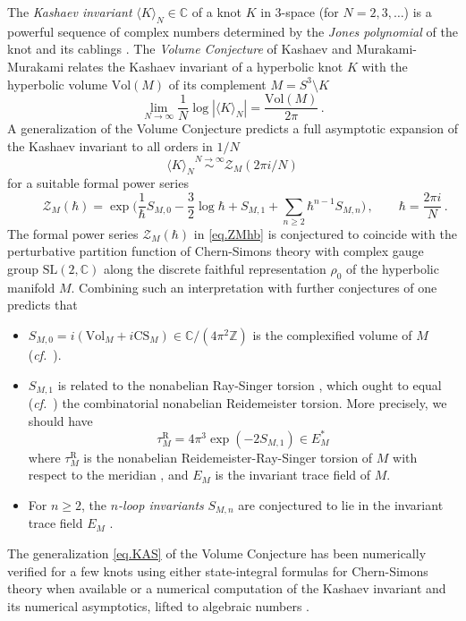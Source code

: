 \documentclass[12pt]{amsart}
\newcommand{\lbl}{\label}
\newcommand{\Reid}{\mathrm{R}}
\theoremstyle{definition}
\def\BZ{\mathbb Z}
\def\BC{\mathbb C}
\def\la{\langle}
\def\ra{\rangle}
\def\SL{\mathrm{SL}}
\def\be{  \begin{equation} }
\def\ee{  \end{equation} }
\def\hb{\hbar}
\def\vol{\mathrm{Vol}}
\newcommand{\CZ}{\mathcal{Z}}
\newcommand{\cf}{\emph{cf.}}
\numberwithin{equation}{section}
\begin{document}
The {\em Kashaev invariant} $\la K \ra_N \in \BC$ 
of a knot $K$ in 3-space (for $N=2,3,\dots$) is a powerful sequence of 
complex numbers determined by the {\em Jones polynomial} of the knot \cite{Jo} 
and its cablings \cite{Turaev, Witten-Jones}. The {\em Volume Conjecture} 
of Kashaev and Murakami-Murakami \cite{K94,K95,MM} relates the 
Kashaev invariant of a hyperbolic knot $K$ with the hyperbolic volume 
$\vol(M)$ of its complement $M=S^3\setminus K$ \cite{Th}
\be
\lim_{N\to\infty} \frac{1}{N} \log|\la K \ra_N|=\frac{\vol(M)}{2\pi} \,.
\ee
A generalization  of the Volume Conjecture \cite{Gu} 
predicts a full asymptotic expansion of the Kashaev invariant to all orders in
$1/N$ 
\be
\lbl{eq.KAS}
\la K \ra_N \overset{N\to\infty}{\sim} \CZ_M(2 \pi i /N)
\ee
for a suitable formal power series 
\be
\lbl{eq.ZMhb}
\qquad \CZ_M(\hb)=\exp\bigg(\frac1\hbar S_{M,0}-\frac32\log\hbar+S_{M,1}
+\sum_{n\geq 2}\hbar^{n-1}S_{M,n}\bigg)\,,\qquad \hbar = \frac{2\pi i}{N}\,.
\ee
The formal power series $\CZ_M(\hb)$ in \eqref{eq.ZMhb} is 
conjectured to coincide with the perturbative partition function of Chern-Simons theory with complex gauge group $\SL(2,\BC)$ along the discrete
faithful representation $\rho_0$ of the hyperbolic manifold $M$.
Combining such an interpretation with
further conjectures of \cite{DGLZ,Ga1,GL} one predicts that 
\begin{itemize}
%
\item
$S_{M,0}=i(\text{Vol}_M+i\text{CS}_M) \in \BC/(4 \pi^2\BZ)$ is the complexified volume of $M$ (\cf\ \cite{Thurston-paper, Neumann-combi}).
%
\item
$S_{M,1}$ is related \cite{Witten-cx, BNW, GuM} to the nonabelian 
Ray-Singer torsion \cite{RS}, which ought to equal (\cf\ \cite{Muller-cx}) the combinatorial
nonabelian Reidemeister torsion. More precisely, 
\cite[Conj.1.8]{DG} we should have
\be \label{TRMS1}
\tau^\Reid_M= 4\pi^3 \exp(-2 S_{M,1}) \in E_M^*
\ee
where $\tau^\Reid_M$ is the nonabelian Reidemeister-Ray-Singer torsion of 
$M$ with respect to the meridian \cite{Po,Db}, 
and $E_M$ is the invariant trace field of $M$.
%
\item
For $n \geq 2$, the {\em $n$-loop invariants} $S_{M,n}$ 
are conjectured to lie in the invariant trace field $E_M$ \cite{DGLZ,Ga1}.
\end{itemize}

The generalization \eqref{eq.KAS} of the Volume Conjecture has been 
numerically verified for a few knots using either state-integral formulas for
Chern-Simons theory when available \cite{DGLZ} or a numerical 
computation of the Kashaev invariant and its numerical asymptotics, lifted to
algebraic numbers \cite{GZ,Ga2}. 
\end{document}
